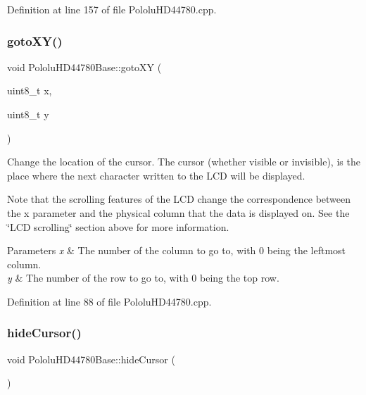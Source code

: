 Definition at line 157 of file Pololu\+H\+D44780.\+cpp.

\mbox{\label{class_pololu_h_d44780_base_a4886df8c888669cf71675072689ace9b}} 
\subsubsection{\texorpdfstring{goto\+X\+Y()}{gotoXY()}}
{\footnotesize\ttfamily void Pololu\+H\+D44780\+Base\+::goto\+XY (\begin{DoxyParamCaption}\item[{uint8\+\_\+t}]{x,  }\item[{uint8\+\_\+t}]{y }\end{DoxyParamCaption})\hspace{0.3cm}{\ttfamily [inherited]}}

Change the location of the cursor. The cursor (whether visible or invisible), is the place where the next character written to the L\+CD will be displayed.

Note that the scrolling features of the L\+CD change the correspondence between the {\ttfamily x} parameter and the physical column that the data is displayed on. See the \char`\"{}\+L\+C\+D scrolling\char`\"{} section above for more information.


\begin{DoxyParams}{Parameters}
{\em x} & The number of the column to go to, with 0 being the leftmost column. \\
\hline
{\em y} & The number of the row to go to, with 0 being the top row. \\
\hline
\end{DoxyParams}


Definition at line 88 of file Pololu\+H\+D44780.\+cpp.

\mbox{\label{class_pololu_h_d44780_base_a1db083d254d251c479a577f29bcdcec8}} 
\subsubsection{\texorpdfstring{hide\+Cursor()}{hideCursor()}}
{\footnotesize\ttfamily void Pololu\+H\+D44780\+Base\+::hide\+Cursor (\begin{DoxyParamCaption}{ }\end{DoxyParamCaption})\hspace{0.3cm}{\ttfamily [inherited]}}

